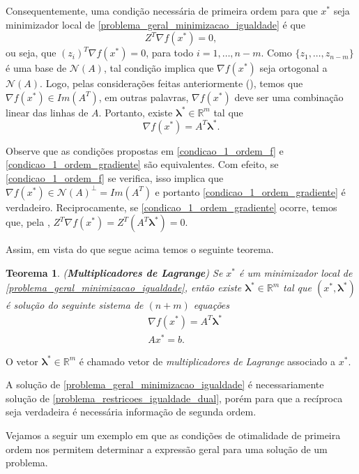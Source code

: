 \documentclass[12pt,a4paper]{scrartcl}
\def\RR{\mathds{R}}
\newtheorem{teo}{Teorema}
\theoremstyle{definition}%
\begin{document}
Consequentemente, uma condição necessária de primeira ordem para que $x^{*}$ seja minimizador local de \eqref{problema_geral_minimizacao_igualdade} é que
\[ \label{condicao_1_ordem_f}
Z^{T} \nabla f(x^{*}) = 0,
\]
ou seja, que $(z_{i})^{T} \nabla f(x^{*}) =0$, para todo $i=1, \ldots , n-m$. Como $\{ z_{1}, \ldots , z_{n-m} \}$ é uma base de $\mathcal{N}(A)$, tal condição implica que $\nabla f(x^{*})$ seja ortogonal a $\mathcal{N}(A)$. Logo, pelas considerações feitas anteriormente (), temos que $\nabla f(x^{*}) \in Im(A^{T})$, em outras palavras, $\nabla f(x^{*})$ deve ser uma combinação linear das linhas de $A$. Portanto, existe $\boldsymbol{\lambda}^{*} \in \RR^{m}$ tal que
\[ \label{condicao_1_ordem_gradiente}
\nabla f(x^{*}) = A^{T} \boldsymbol{\lambda}^{*} .
\] 

Observe que as condições propostas em \eqref{condicao_1_ordem_f} e \eqref{condicao_1_ordem_gradiente} são equivalentes. Com efeito, se \eqref{condicao_1_ordem_f} se verifica, isso implica que $\nabla f(x^{*}) \in \mathcal{N}(A)^{\bot} = Im(A^{T})$ e portanto \eqref{condicao_1_ordem_gradiente} é verdadeiro. Reciprocamente, se \eqref{condicao_1_ordem_gradiente} ocorre, temos que, pela , $Z^{T}\nabla f(x^{*}) = Z^{T}(A^{T} \boldsymbol{\lambda}^{*}) = 0$.

Assim, em vista do que segue acima temos o seguinte teorema.
\begin{teo} \label{teo:multiplicadores_de_lagrange} (\textbf{Multiplicadores de Lagrange})
Se $x^{*}$ é um minimizador local de \eqref{problema_geral_minimizacao_igualdade}, então existe $\boldsymbol{\lambda}^{*} \in \RR^{m}$ tal que $(x^{*}, \boldsymbol{\lambda}^{*})$ é solução do seguinte sistema de $(n+m)$ equações
\[ \label{problema_restricoes_igualdade_dual}
\begin{aligned}
& \nabla f(x^{*}) = A^{T} \boldsymbol{\lambda}^{*} \\
& Ax^{*} = b .
\end{aligned}
\]
\end{teo}

O vetor $\boldsymbol{\lambda}^{*} \in \RR^{m}$ é chamado vetor de \emph{multiplicadores de Lagrange} associado a $x^{*}$.

A solução de \eqref{problema_geral_minimizacao_igualdade} é necessariamente solução de \eqref{problema_restricoes_igualdade_dual}, porém para que a recíproca seja verdadeira é necessária informação de segunda ordem.

Vejamos a seguir um exemplo em que as condições de otimalidade de primeira ordem nos permitem determinar a expressão geral para uma solução de um problema.
\end{document}
